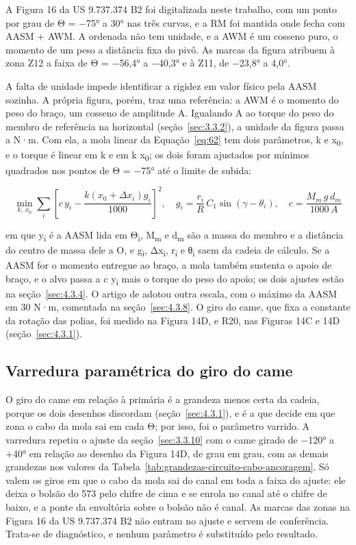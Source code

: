 A Figura 16 da US 9.737.374 B2 foi digitalizada neste trabalho, com um ponto por grau de Θ = −75° a 30° nas três curvas, e a RM foi mantida onde fecha com AASM + AWM. A ordenada não tem unidade, e a AWM é um cosseno puro, o momento de um peso a distância fixa do pivô. As marcas da figura atribuem à zona Z12 a faixa de Θ = −56,4° a −40,3° e à Z11, de −23,8° a 4,0°.

A falta de unidade impede identificar a rigidez em valor físico pela AASM sozinha. A própria figura, porém, traz uma referência: a AWM é o momento do peso do braço, um cosseno de amplitude A. Igualando A ao torque do peso do membro de referência na horizontal (seção~\ref{sec:3.3.2}), a unidade da figura passa a N·m. Com ela, a mola linear da Equação~\eqref{eq:62} tem dois parâmetros, k e x\textsubscript{0}, e o torque é linear em k e em k x\textsubscript{0}; os dois foram ajustados por mínimos quadrados nos pontos de Θ = −75° até o limite de subida:

\begin{equation}
  \min_{k,\, x_{0}}\sum_{i}^{}\left\lbrack c\, y_{i} - \frac{k(x_{0} + \Delta x_{i})g_{i}}{1000} \right\rbrack^{2},\quad g_{i} = \frac{r_{i}}{R}\, C_{1}\sin{(\gamma - \theta_{i})},\quad c = \frac{M_{m}\, g\, d_{m}}{1000\, A}
  \label{eq:67}
\end{equation}

em que y\textsubscript{i} é a AASM lida em Θ\textsubscript{i}, M\textsubscript{m} e d\textsubscript{m} são a massa do membro e a distância do centro de massa dele a O, e g\textsubscript{i}, Δx\textsubscript{i}, r\textsubscript{i} e θ\textsubscript{i} saem da cadeia de cálculo. Se a AASM for o momento entregue ao braço, a mola também sustenta o apoio de braço, e o alvo passa a c y\textsubscript{i} mais o torque do peso do apoio; os dois ajustes estão na seção~\ref{sec:4.3.4}. O artigo de \textcite{okabe2026} adotou outra escala, com o máximo da AASM em 30 N·m, comentada na seção~\ref{sec:4.3.8}. O giro do came, que fixa a constante da rotação das polias, foi medido na Figura 14D, e R20, nas Figuras 14C e 14D (seção~\ref{sec:4.3.1}).

\subsection{Varredura paramétrica do giro do came}\label{sec:3.3.11}

O giro do came em relação à primária é a grandeza menos certa da cadeia, porque os dois desenhos discordam (seção~\ref{sec:4.3.1}), e é a que decide em que zona o cabo da mola sai em cada Θ; por isso, foi o parâmetro varrido. A varredura repetiu o ajuste da seção~\ref{sec:3.3.10} com o came girado de −120° a +40° em relação ao desenho da Figura 14D, de grau em grau, com as demais grandezas nos valores da Tabela~\ref{tab:grandezas-circuito-cabo-ancoragem}. Só valem os giros em que o cabo da mola sai do canal em toda a faixa do ajuste: ele deixa o bolsão do 573 pelo chifre de cima e se enrola no canal até o chifre de baixo, e a ponte da envoltória sobre o bolsão não é canal. As marcas das zonas na Figura 16 da US 9.737.374 B2 não entram no ajuste e servem de conferência. Trata-se de diagnóstico, e nenhum parâmetro é substituído pelo resultado.

